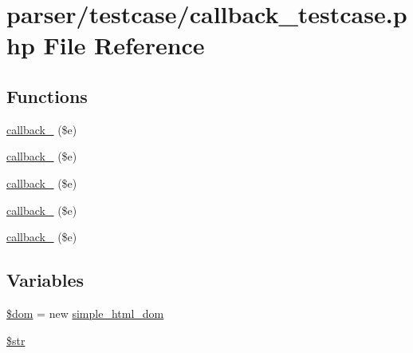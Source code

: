 \hypertarget{callback__testcase_8php}{\section{parser/testcase/callback\+\_\+testcase.php File Reference}
\label{callback__testcase_8php}
}
\subsection*{Functions}
\begin{DoxyCompactItemize}
\item 
\hyperlink{callback__testcase_8php_affb538f1e28d832935f55a5934c7e8a8}{callback\+\_} (\$e)
\item 
\hyperlink{callback__testcase_8php_a99e39d21c3f06378a515e1267a8d66ea}{callback\+\_} (\$e)
\item 
\hyperlink{callback__testcase_8php_a88c88c63e41001e314f091ee08e81be2}{callback\+\_} (\$e)
\item 
\hyperlink{callback__testcase_8php_acf3f1f1f92a96d90d5fe042976db4f10}{callback\+\_} (\$e)
\item 
\hyperlink{callback__testcase_8php_a505fe2d855f161ee34959f37b77169c3}{callback\+\_} (\$e)
\end{DoxyCompactItemize}
\subsection*{Variables}
\begin{DoxyCompactItemize}
\item 
\hyperlink{callback__testcase_8php_a46127a794280dd592812c25b62af34b0}{\$dom} = new \hyperlink{classsimple__html__dom}{simple\+\_\+html\+\_\+dom}
\item 
\hyperlink{callback__testcase_8php_a7542d95618011800c61773127fa625cf}{\$str}
\end{DoxyCompactItemize}


